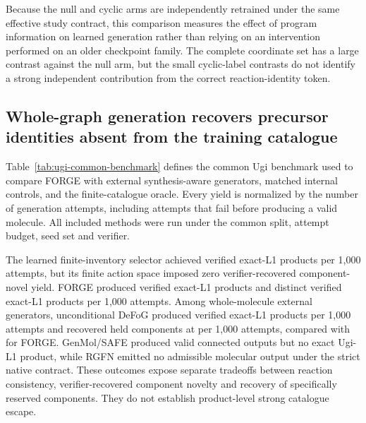 \documentclass{article}
\begin{document}
Because the null and cyclic arms are independently retrained under the same effective study
contract, this comparison measures the effect of program information on learned generation rather
than relying on an intervention performed on an older checkpoint family. The complete coordinate
set has a large contrast against the null arm, but the small cyclic-label contrasts do not identify
a strong independent contribution from the correct reaction-identity token.

\subsection{Whole-graph generation recovers precursor identities absent from the training catalogue}

Table~\ref{tab:ugi-common-benchmark} defines the common Ugi benchmark used to compare FORGE with
external synthesis-aware generators, matched internal controls, and the finite-catalogue oracle.
Every yield is normalized by the number of generation attempts, including attempts that fail before
producing a valid molecule.
All included methods were run under the common split, attempt budget, seed set and verifier.



The learned finite-inventory selector achieved \ForgeProseCommonSelectorExactPerThousand{} verified
exact-L1 products per 1,000
attempts, but its finite action space imposed zero verifier-recovered component-novel yield. FORGE
produced \ForgeProseCommonForgeExactPerThousand{} verified exact-L1 products and
\ForgeProseCommonForgeDistinctPerThousand{} distinct verified exact-L1 products per 1,000 attempts.
Among whole-molecule external generators, unconditional DeFoG produced
\ForgeProseCommonDefogExactPerThousand{} verified exact-L1 products per 1,000 attempts and recovered
held components at \ForgeProseCommonDefogHeldPerThousand{} per 1,000 attempts, compared with
\ForgeProseCommonForgeHeldPerThousand{} for FORGE. GenMol/SAFE produced
\ForgeProseCommonGenmolValidPerThousand{} valid connected outputs but no exact Ugi-L1 product, while
RGFN emitted no admissible
molecular output under the strict native contract. These outcomes expose separate tradeoffs between
reaction consistency, verifier-recovered component novelty and recovery of specifically reserved
components. They do not establish product-level strong catalogue escape.
\end{document}
